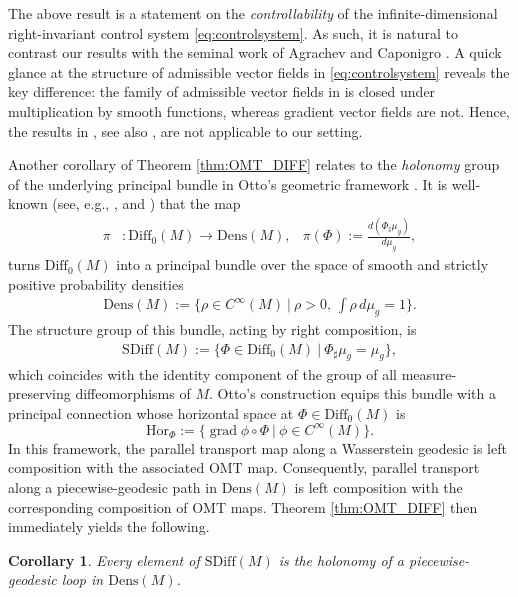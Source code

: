 \documentclass{article}
\newtheorem{corollary}[theorem]{Corollary}
\theoremstyle{remark}
\newcommand{\M}{M}
\newcommand{\Cinf}{C^{\infty}(\M)}
\newcommand{\Diff}{\mathrm{Diff}_0(\M)}
\newcommand{\SDiff}{\mathrm{SDiff}(\M)}
\newcommand{\Dens}{\mathrm{Dens}(\M)}
\DeclareMathOperator{\grad}{\mathrm{grad}}
\newcommand{\hor}{\mathrm{Hor}}
\begin{document}
%
The above result is a statement on the \emph{controllability} of the infinite-dimensional right-invariant control system \eqref{eq:controlsystem}. As such, it is natural to contrast our results with the seminal work of Agrachev and Caponigro \cite{AgrachevCaponigro2009}. A quick glance at the structure of admissible vector fields in \eqref{eq:controlsystem} reveals the key difference: the family of admissible vector fields in \cite{AgrachevCaponigro2009} is closed under multiplication by smooth functions, whereas gradient vector fields are not. Hence, the results in \cite{AgrachevCaponigro2009}, see also \cite{ArguillereTrelat2017}, are not applicable to our setting. 
%

%
Another corollary of Theorem \ref{thm:OMT_DIFF} relates to the \emph{holonomy} group of the underlying principal bundle in Otto's geometric framework \cite{otto2001geometry}. It is well-known (see, e.g., \cite[Appendix A.5]{WendtKhesin2009}, and \cite[Part~III, Theorem 2.3.5]{Hamilton1982}) that the map
%
\begin{align*}
    \pi&:\Diff\rightarrow\Dens, & \pi(\Phi):=\frac{d(\Phi_\sharp \mu_g)}{d\mu_g},
\end{align*}
%
turns $\Diff$ into a principal bundle over the space of smooth and strictly positive probability densities
%
\begin{align*}
    \Dens:=\{\rho\in \Cinf ~|~\rho>0,\,\textstyle\int\rho\,d\mu_g = 1\}.
\end{align*}
%
The structure group of this bundle, acting by right composition, is
%
\begin{align*}
    \SDiff:=\{\Phi\in\Diff~|~\Phi_\sharp \mu_g = \mu_g\},
\end{align*}
%
which coincides with the identity component of the group of all measure-preserving diffeomorphisms of $\M$. Otto's construction equips this bundle with a principal connection whose horizontal space at $\Phi\in\Diff$ is
%
$$
\hor_{\Phi}:=\{\grad\phi\circ\Phi~|~\phi\in\Cinf\}.
$$
%
In this framework, the parallel transport map along a Wasserstein geodesic is left composition with the associated OMT map. Consequently, parallel transport along a piecewise-geodesic path in $\Dens$ is left composition with the corresponding composition of OMT maps. Theorem \ref{thm:OMT_DIFF} then immediately yields the following.
%
\begin{corollary}\label{cor:holonomy}
    Every element of $\SDiff$ is the holonomy of a piecewise-geodesic loop in $\Dens$.
\end{corollary}
\end{document}
